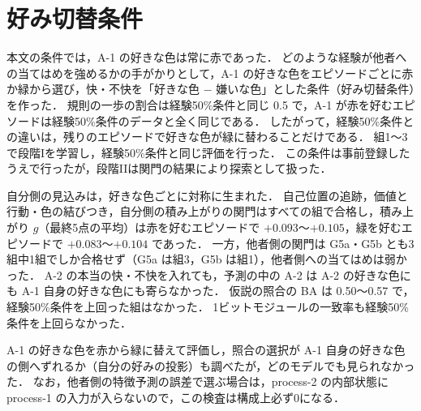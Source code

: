 \setcounter{table}{0}
\renewcommand{\thetable}{A\arabic{table}}
\setcounter{figure}{0}
\renewcommand{\thefigure}{A\arabic{figure}}

\section{好み切替条件}\label{app:switch}
本文の条件では，A-1 の好きな色は常に赤であった．
どのような経験が他者への当てはめを強めるかの手がかりとして，A-1 の好きな色をエピソードごとに赤か緑から選び，快・不快を「好きな色 $-$ 嫌いな色」とした条件（好み切替条件）を作った．
規則の一歩の割合は経験50\%条件と同じ 0.5 で，A-1 が赤を好むエピソードは経験50\%条件のデータと全く同じである．
したがって，経験50\%条件との違いは，残りのエピソードで好きな色が緑に替わることだけである．
組1〜3 で段階Iを学習し，経験50\%条件と同じ評価を行った．
この条件は事前登録したうえで行ったが，段階IIは関門の結果により探索として扱った．

自分側の見込みは，好きな色ごとに対称に生まれた．
自己位置の追跡，価値と行動・色の結びつき，自分側の積み上がりの関門はすべての組で合格し，積み上がり $g$（最終5点の平均）は赤を好むエピソードで $+0.093$〜$+0.105$，緑を好むエピソードで $+0.083$〜$+0.104$ であった．
一方，他者側の関門は G5a・G5b とも3組中1組でしか合格せず（G5a は組3，G5b は組1），他者側への当てはめは弱かった．
A-2 の本当の快・不快を入れても，予測の中の A-2 は A-2 の好きな色にも A-1 自身の好きな色にも寄らなかった．
仮説の照合の BA は 0.50〜0.57 で，経験50\%条件を上回った組はなかった．
1ビットモジュールの一致率も経験50\%条件を上回らなかった．

A-1 の好きな色を赤から緑に替えて評価し，照合の選択が A-1 自身の好きな色の側へずれるか（自分の好みの投影）も調べたが，どのモデルでも見られなかった．
なお，他者側の特徴予測の誤差で選ぶ場合は，process-2 の内部状態に process-1 の入力が入らないので，この検査は構成上必ず0になる．

